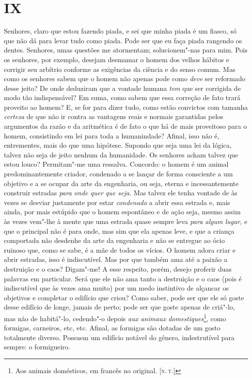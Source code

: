 \section{IX}

Senhores, claro que estou fazendo piada, e sei que minha piada é um
fiasco, só que não dá para levar tudo como piada. Pode ser que eu faça
piada rangendo os dentes. Senhores, umas questões me atormentam;
solucionem"-nas para mim. Pois os senhores, por exemplo, desejam desmamar
o homem dos velhos hábitos e corrigir seu arbítrio conforme as
exigências da ciência e do senso comum. Mas como os senhores sabem que o
homem não apenas pode como \emph{deve} ser reformado desse jeito? De
onde deduziram que a vontade humana \emph{tem} que ser corrigida de modo
tão indispensável? Em suma, como sabem que essa correção de fato trará
proveito ao homem? E, se for para dizer tudo, como estão convictos com
tamanha \emph{certeza} de que não ir contra as vantagens reais e normais
garantidas pelos argumentos da razão e da aritmética é de fato o que há
de mais proveitoso para o homem, consistindo em lei para toda a
humanindade? Afinal, isso não é, entrementes, mais do que uma hipótese.
Supondo que seja uma lei da lógica, talvez não seja de jeito nenhum da
humanidade. Os senhores acham talvez que estou louco? Permitam"-me uma
ressalva. Concordo: o homem é um animal predominantemente criador,
condenado a se lançar de forma consciente a um objetivo e a se ocupar da
arte da engenharia, ou seja, eterna e incessantemente construir estradas
\emph{para onde quer que seja.} Mas talvez ele tenha vontade de às vezes
se desviar justamente por estar \emph{condenado} a abrir essa estrada e,
mais ainda, por mais estúpido que o homem espontâneo e de ação seja,
mesmo assim às vezes vem"-lhe à mente que uma estrada quase sempre leva
\emph{para algum lugar,} e que o principal não é para onde, mas sim que
ela apenas leve, e que a criança comportada não desdenhe da arte da
engenharia e não se entregue ao ócio ruinoso que, como se sabe, é a mãe
de todos os vícios. O homem adora criar e abrir estradas, isso é
indiscutível. Mas por que também ama até a paixão a destruição e o caos?
Digam"-me! A esse respeito, porém, desejo proferir duas palavras em
particular. Será que ele não ama tanto a destruição e o caos (pois é
indiscutível que às vezes ama muito) por um medo instintivo de alçancar
os objetivos e completar o edifício que criou? Como saber, pode ser que
ele só goste desse edifício de longe, jamais de perto; pode ser que
goste apenas de criá"-lo, mas não de habitá"-lo, cedendo"-o depois
\emph{aux animaux domestiques}\footnote{Aos animais domésticos, em
  francês no original. {[}\textsc{n.\,t.}{]}}, como formigas, carneiros,
etc, etc. Afinal, as formigas são dotadas de um gosto totalmente
diverso. Possuem um edifício notável do gênero, indestrutível para
sempre: o formigueiro.

